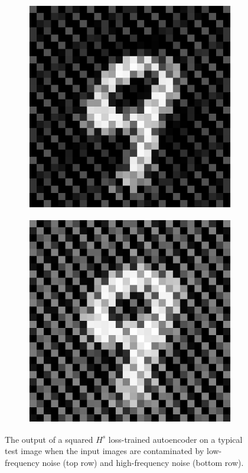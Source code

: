 \documentclass{article} %
\begin{document}
\begin{figure}
\begin{subfigure}{0.22\textwidth}
\end{subfigure}
\hfill
\begin{subfigure}{0.22\textwidth}
\includegraphics[width = \textwidth]{figures-MNIST/high0.eps}
\end{subfigure}
\hfill
\begin{subfigure}{0.22\textwidth}
\includegraphics[width = \textwidth]{figures-MNIST/high1.eps}
\end{subfigure}
\caption{The output of a squared $H^s$ loss-trained autoencoder on a typical test image when the input images are contaminated by low-frequency noise (top row) and high-frequency noise (bottom row).}
\label{fig:autoencoder}
\end{figure}
\end{document}
